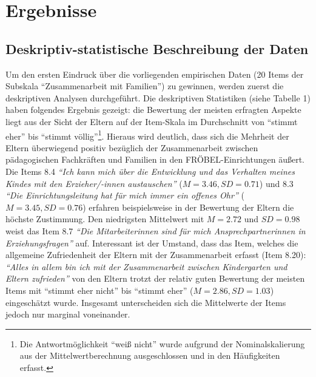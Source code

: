 \documentclass[12pt,a4paper]{article}
\begin{document}
\section{Ergebnisse}  
\subsection{Deskriptiv-statistische Beschreibung der Daten}

Um den ersten Eindruck über die vorliegenden empirischen Daten (20 Items der Subskala "`Zusammenarbeit mit Familien"') zu gewinnen, werden zuerst die deskriptiven Analysen durchgeführt. Die deskriptiven Statistiken (siehe Tabelle 1) haben folgendes Ergebnis gezeigt: die Bewertung der meisten erfragten Aspekte liegt aus der Sicht der Eltern auf der Item-Skala im Durchschnitt von "`stimmt eher"' bis "`stimmt völlig"'\footnote{Die Antwortmöglichkeit "`weiß nicht"' wurde aufgrund der Nominalskalierung aus der Mittelwertberechnung ausgeschlossen und in den Häufigkeiten erfasst.}. Hieraus wird deutlich, dass sich die Mehrheit der Eltern überwiegend positiv bezüglich der Zusammenarbeit zwischen pädagogischen Fachkräften und Familien in den FRÖBEL-Einrichtungen äußert. Die Items 8.4 \textit{"`Ich kann mich über die Entwicklung und das Verhalten meines Kindes mit den Erzieher/-innen austauschen"'} ($M = 3.46, SD = 0.71$) und 8.3 \textit{"`Die Einrichtungsleitung hat für mich immer ein offenes Ohr"'} ($M = 3.45, SD = 0.76$) erfahren beispielsweise in der Bewertung der Eltern die höchste Zustimmung. Den niedrigsten Mittelwert mit $M = 2.72$ und $SD = 0.98$ weist das Item 8.7 \textit{"`Die Mitarbeiterinnen sind für mich Ansprechpartnerinnen in Erziehungsfragen"'} auf. Interessant ist der Umstand, dass das Item, welches die allgemeine Zufriedenheit der Eltern mit der Zusammenarbeit erfasst (Item 8.20): \textit{"`Alles in allem bin ich mit der Zusammenarbeit zwischen Kindergarten und Eltern zufrieden"'} von den Eltern trotzt der relativ guten Bewertung der meisten Items mit "`stimmt eher nicht"' bis "`stimmt eher"' ($M = 2.86, SD = 1.03$) eingeschätzt wurde. Insgesamt unterscheiden sich die Mittelwerte der Items jedoch nur marginal voneinander.
\end{document}
